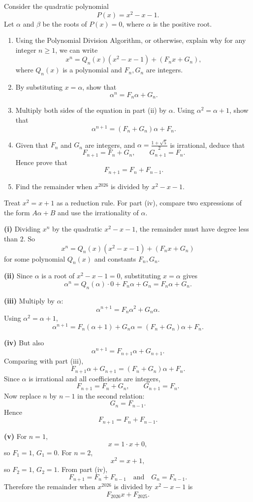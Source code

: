 \begin{problem}
Consider the quadratic polynomial
\[
P(x)=x^2-x-1.
\]
Let $\alpha$ and $\beta$ be the roots of $P(x)=0$, where $\alpha$ is the positive root.

\begin{enumerate}[label=(\roman*)]
\item Using the Polynomial Division Algorithm, or otherwise, explain why for any integer $n\ge 1$, we can write
\[
x^n=Q_n(x)(x^2-x-1)+(F_nx+G_n),
\]
where $Q_n(x)$ is a polynomial and $F_n,G_n$ are integers.
\item By substituting $x=\alpha$, show that
\[
\alpha^n=F_n\alpha+G_n.
\]
\item Multiply both sides of the equation in part (ii) by $\alpha$. Using $\alpha^2=\alpha+1$, show that
\[
\alpha^{n+1}=(F_n+G_n)\alpha+F_n.
\]
\item Given that $F_n$ and $G_n$ are integers, and $\alpha=\frac{1+\sqrt5}{2}$ is irrational, deduce that
\[
F_{n+1}=F_n+G_n,\qquad G_{n+1}=F_n.
\]
Hence prove that
\[
F_{n+1}=F_n+F_{n-1}.
\]
\item Find the remainder when $x^{2026}$ is divided by $x^2-x-1$.
\end{enumerate}
\end{problem}

\begin{hintbox}
Treat $x^2=x+1$ as a reduction rule. For part (iv), compare two expressions of the form $A\alpha+B$ and use the irrationality of $\alpha$.
\end{hintbox}

\begin{solution}
\textbf{(i)} Dividing $x^n$ by the quadratic $x^2-x-1$, the remainder must have degree less than $2$. So
\[
x^n=Q_n(x)(x^2-x-1)+(F_nx+G_n)
\]
for some polynomial $Q_n(x)$ and constants $F_n,G_n$.

\textbf{(ii)} Since $\alpha$ is a root of $x^2-x-1=0$, substituting $x=\alpha$ gives
\[
\alpha^n=Q_n(\alpha)\cdot 0+F_n\alpha+G_n=F_n\alpha+G_n.
\]

\textbf{(iii)} Multiply by $\alpha$:
\[
\alpha^{n+1}=F_n\alpha^2+G_n\alpha.
\]
Using $\alpha^2=\alpha+1$,
\[
\alpha^{n+1}=F_n(\alpha+1)+G_n\alpha=(F_n+G_n)\alpha+F_n.
\]

\textbf{(iv)} But also
\[
\alpha^{n+1}=F_{n+1}\alpha+G_{n+1}.
\]
Comparing with part (iii),
\[
F_{n+1}\alpha+G_{n+1}=(F_n+G_n)\alpha+F_n.
\]
Since $\alpha$ is irrational and all coefficients are integers,
\[
F_{n+1}=F_n+G_n,\qquad G_{n+1}=F_n.
\]
Now replace $n$ by $n-1$ in the second relation:
\[
G_n=F_{n-1}.
\]
Hence
\[
\boxed{F_{n+1}=F_n+F_{n-1}.}
\]

\textbf{(v)} For $n=1$,
\[
x=1\cdot x+0,
\]
so $F_1=1$, $G_1=0$.
For $n=2$,
\[
x^2=x+1,
\]
so $F_2=1$, $G_2=1$.
From part (iv),
\[
F_{n+1}=F_n+F_{n-1}
\quad\text{and}\quad
G_n=F_{n-1}.
\]
Therefore the remainder when $x^{2026}$ is divided by $x^2-x-1$ is
\[
\boxed{F_{2026}x+F_{2025}.}
\]
\end{solution}

